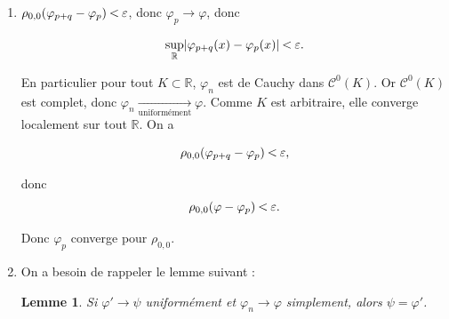 \documentclass[french]{book}
\newtheorem*{lemma}{Lemme}
\newcommand{\lesss}{\rotatebox[origin=c]{90}{$\land$}}
\newcommand{\less}{\ \lesss\ }
\begin{document}
\begin{enumerate}
  \item \(\rho _{0, 0}(\varphi _{p+q} - \varphi _{p}) \less \varepsilon\), donc \( \varphi _{p} \longrightarrow \varphi\), donc

  \[\sup_{ \mathbb{R} } \lvert \varphi _{p+q} (x) - \varphi _{p}(x) \rvert \less \varepsilon. \]

  En particulier pour tout \(K \subset \mathbb{R}\), \(\varphi_n\) est de Cauchy dans \(\mathcal{C}^0(K)\). Or \(\mathcal{C}^0(K)\) est complet, donc \(\varphi_n \underset{\text{uniformément}}{\longrightarrow} \varphi.\) Comme \(K\) est arbitraire, elle converge localement sur tout \(\mathbb{R}\). On a

  \[\rho _{0, 0}(\varphi _{p+q} - \varphi_p) \less \varepsilon, \]

  donc \[\rho _{0, 0}(\varphi - \varphi_p) \less \varepsilon.\]

  Donc \(\varphi _{p}\) converge pour \(\rho _{0,0}\).

  \item On a besoin de rappeler le lemme suivant :

  \begin{lemma}
    Si \(\varphi' \longrightarrow \psi\) uniformément et \(\varphi_n \longrightarrow \varphi\) simplement, alors \(\psi = \varphi'\).
  \end{lemma}
\end{enumerate}
\end{document}
